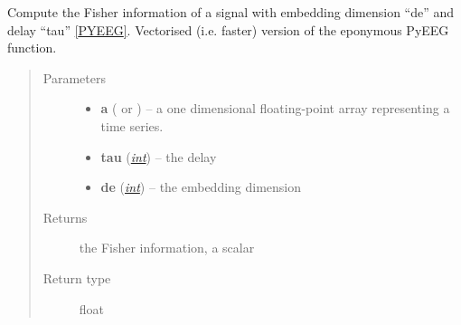 \documentclass[letterpaper,10pt,english]{sphinxmanual}
\begin{document}

\begin{fulllineitems}
\label{pyrem.univariate:pyrem.univariate.fisher_info}
Compute the Fisher information of a signal with embedding dimension ``de'' and delay ``tau'' {\hyperref[pyrem.univariate:pyeeg]{{[}PYEEG{]}}}.
Vectorised (i.e. faster) version of the eponymous PyEEG function.
\begin{quote}\begin{description}
\item[{Parameters}] \leavevmode\begin{itemize}
\item {} 
\textbf{a} (\href{http://docs.scipy.org/doc/numpy/reference/generated/numpy.ndarray.html\#numpy.ndarray}{} or {\hyperref[pyrem.time_series:pyrem.time_series.Signal]{}}) -- a one dimensional floating-point array representing a time series.

\item {} 
\textbf{tau} (\href{http://docs.python.org/2.7/library/functions.html\#int}{\emph{int}}) -- the delay

\item {} 
\textbf{de} (\href{http://docs.python.org/2.7/library/functions.html\#int}{\emph{int}}) -- the embedding dimension

\end{itemize}

\item[{Returns}] \leavevmode
the Fisher information, a scalar

\item[{Return type}] \leavevmode
float

\end{description}\end{quote}

\end{fulllineitems}

\end{document}
